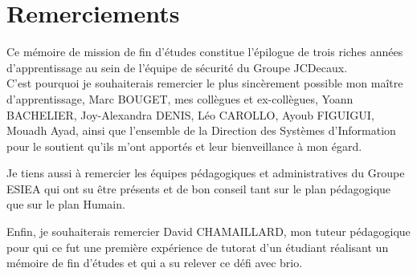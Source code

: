 

\chapter*{Remerciements}
Ce mémoire de mission de fin d'études constitue l'épilogue de trois riches années d'apprentissage au sein de l'équipe de
sécurité du Groupe JCDecaux.\\
C'est pourquoi je souhaiterais remercier le plus sincèrement possible mon maître d'apprentissage, Marc BOUGET, mes collègues 
et ex-collègues, Yoann BACHELIER, Joy-Alexandra DENIS, Léo CAROLLO, Ayoub FIGUIGUI, Mouadh Ayad, ainsi que l'ensemble de la
Direction des Systèmes d'Information pour le soutient qu'ils m'ont apportés et leur bienveillance à mon égard.

Je tiens aussi à remercier les équipes pédagogiques et administratives du Groupe ESIEA qui ont su être présents et de bon conseil 
tant sur le plan pédagogique que sur le plan Humain.

Enfin, je souhaiterais remercier David CHAMAILLARD, mon tuteur pédagogique pour qui ce fut une première expérience de tutorat d'un
étudiant réalisant un mémoire de fin d'études et qui a su relever ce défi avec brio.

